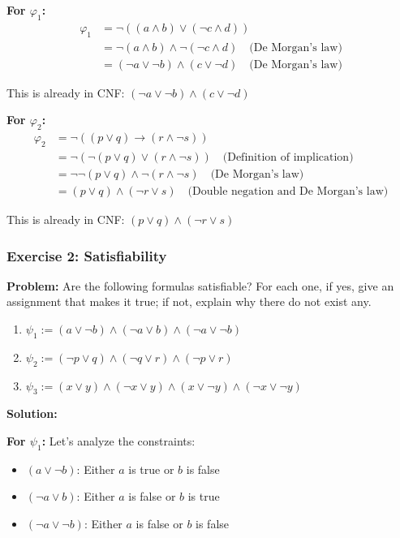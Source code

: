 \documentclass{article}
\begin{document}
\textbf{For $\varphi_1$:}
\begin{align}
\varphi_1 &= \neg((a \land b) \lor (\neg c \land d)) \\
&= \neg(a \land b) \land \neg(\neg c \land d) \quad \text{(De Morgan's law)} \\
&= (\neg a \lor \neg b) \land (c \lor \neg d) \quad \text{(De Morgan's law)}
\end{align}

This is already in CNF: $(\neg a \lor \neg b) \land (c \lor \neg d)$

\textbf{For $\varphi_2$:}
\begin{align}
\varphi_2 &= \neg((p \lor q) \to (r \land \neg s)) \\
&= \neg(\neg(p \lor q) \lor (r \land \neg s)) \quad \text{(Definition of implication)} \\
&= \neg\neg(p \lor q) \land \neg(r \land \neg s) \quad \text{(De Morgan's law)} \\
&= (p \lor q) \land (\neg r \lor s) \quad \text{(Double negation and De Morgan's law)}
\end{align}

This is already in CNF: $(p \lor q) \land (\neg r \lor s)$

\subsubsection{Exercise 2: Satisfiability}

\textbf{Problem:} Are the following formulas satisfiable? For each one, if yes, give an assignment that makes it true; if not, explain why there do not exist any.

\begin{enumerate}
    \item $\psi_1 := (a \lor \neg b) \land (\neg a \lor b) \land (\neg a \lor \neg b)$
    \item $\psi_2 := (\neg p \lor q) \land (\neg q \lor r) \land (\neg p \lor r)$
    \item $\psi_3 := (x \lor y) \land (\neg x \lor y) \land (x \lor \neg y) \land (\neg x \lor \neg y)$
\end{enumerate}

\textbf{Solution:}

\textbf{For $\psi_1$:}
Let's analyze the constraints:
\begin{itemize}
    \item $(a \lor \neg b)$: Either $a$ is true or $b$ is false
    \item $(\neg a \lor b)$: Either $a$ is false or $b$ is true
    \item $(\neg a \lor \neg b)$: Either $a$ is false or $b$ is false
\end{itemize}
\end{document}
